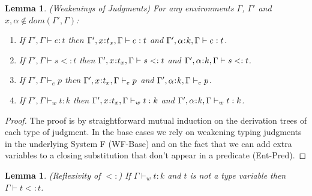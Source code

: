 \documentclass[11pt]{article}
\newtheorem{lemma}[theorem]{Lemma}
\newcommand{\al}{\alpha}
\newcommand{\bind}{\hspace{0.05em}{:}\hspace{0.05em}} %
\begin{document}
\begin{lemma}\label{weakenings}
(Weakenings of Judgments) For any environments $\Gamma$, $\Gamma'$ and $x,\al \not\in dom(\Gamma', \Gamma)$:
\begin{enumerate}
\item If $\Gamma', \Gamma \vdash e : t$ then $\Gamma', x\bind t_x, \Gamma \vdash e :  t$ and $\Gamma', \al\bind k, \Gamma \vdash e :  t$.
\item If $\Gamma', \Gamma \vdash s <: t$ then $\Gamma', x\bind t_x, \Gamma \vdash s <: t$ and $\Gamma', \al\bind k, \Gamma \vdash s <: t$.
\item If $\Gamma', \Gamma \vdash_e p$ then $\Gamma', x\bind t_x, \Gamma \vdash_e p$ and $\Gamma', \al\bind k, \Gamma \vdash_e p$.
\item If $\Gamma', \Gamma \vdash_w t:k$ then $\Gamma', x\bind t_x, \Gamma \vdash_w t:k$ and $\Gamma', \al\bind k, \Gamma \vdash_w t:k$.
\end{enumerate}
\end{lemma}
\begin{proof}
The proof is by straightforward mutual induction on the derivation trees of each type of judgment. In the base cases we rely on weakening typing judgments in the underlying System F ({\sc WF-Base}) and on the fact that we can add extra variables to a closing substitution that don't appear in a predicate ({\sc Ent-Pred}).
\end{proof}

\begin{lemma}\label{sub-refl}
(Reflexivity of $<:$) If $\Gamma \vdash_w t : k$ and $t$ is not a type variable then $\Gamma \vdash t <: t$.
\end{lemma}
\end{document}
